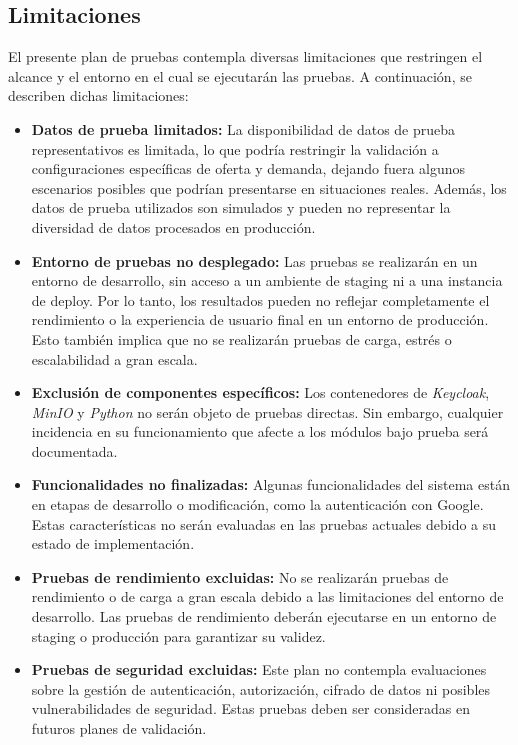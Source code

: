 \documentclass[stu, 12pt, letterpaper, donotrepeattitle, floatsintext, natbib]{apa7}
\begin{document}
\subsection{Limitaciones}

El presente plan de pruebas contempla diversas limitaciones que restringen el alcance y el entorno en el cual se ejecutarán las pruebas. A continuación, se describen dichas limitaciones:

\begin{itemize}
    \item \textbf{Datos de prueba limitados:} La disponibilidad de datos de prueba representativos es limitada, lo que podría restringir la validación a configuraciones específicas de oferta y demanda, dejando fuera algunos escenarios posibles que podrían presentarse en situaciones reales. Además, los datos de prueba utilizados son simulados y pueden no representar la diversidad de datos procesados en producción.

    \item \textbf{Entorno de pruebas no desplegado:} Las pruebas se realizarán en un entorno de desarrollo, sin acceso a un ambiente de staging ni a una instancia de deploy. Por lo tanto, los resultados pueden no reflejar completamente el rendimiento o la experiencia de usuario final en un entorno de producción. Esto también implica que no se realizarán pruebas de carga, estrés o escalabilidad a gran escala.

    \item \textbf{Exclusión de componentes específicos:} Los contenedores de \textit{Keycloak}, \textit{MinIO} y \textit{Python} no serán objeto de pruebas directas. Sin embargo, cualquier incidencia en su funcionamiento que afecte a los módulos bajo prueba será documentada.

    \item \textbf{Funcionalidades no finalizadas:} Algunas funcionalidades del sistema están en etapas de desarrollo o modificación, como la autenticación con Google. Estas características no serán evaluadas en las pruebas actuales debido a su estado de implementación.

    \item \textbf{Pruebas de rendimiento excluidas:} No se realizarán pruebas de rendimiento o de carga a gran escala debido a las limitaciones del entorno de desarrollo. Las pruebas de rendimiento deberán ejecutarse en un entorno de staging o producción para garantizar su validez.

    \item \textbf{Pruebas de seguridad excluidas:} Este plan no contempla evaluaciones sobre la gestión de autenticación, autorización, cifrado de datos ni posibles vulnerabilidades de seguridad. Estas pruebas deben ser consideradas en futuros planes de validación.


\end{itemize}
\end{document}
